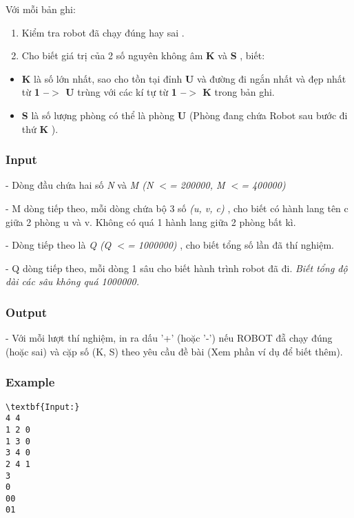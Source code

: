 Với mỗi bản ghi:
\begin{enumerate}
	\item Kiểm tra robot đã chạy đúng hay sai .
	\item Cho biết giá trị của 2 số nguyên không âm \textbf{ K } và \textbf{ S } , biết:
\end{enumerate}
\begin{enumerate}
\end{enumerate}
\begin{itemize}
	\item \textbf{K } là số lớn nhất, sao cho tồn tại đỉnh \textbf{ U } và đường đi ngắn nhất và đẹp nhất từ \textbf{ 1 --$>$ U } trùng với các kí tự từ \textbf{ 1 --$>$ K } trong bản ghi.
	\item \textbf{S } là số lượng phòng có thể là phòng \textbf{ U } (Phòng đang chứa Robot sau bước đi thứ \textbf{ K } ).
\end{itemize}

\subsubsection{Input}

- Dòng đầu chứa hai số \emph{ N } và \emph{ M (N $<$= 200000, M $<$= 400000) }

- M dòng tiếp theo, mỗi dòng chứa bộ 3 số \emph{ (u, v, c) } , cho biết có hành lang tên c giữa 2 phòng u và v. Không có quá 1 hành lang giữa 2 phòng bất kì.

- Dòng tiếp theo là \emph{ Q (Q $<$= 1000000) } , cho biết tổng số lần đã thí nghiệm.

- Q dòng tiếp theo, mỗi dòng 1 sâu cho biết hành trình robot đã đi. \emph{ Biết tổng độ dài các sâu không quá 1000000. }

\subsubsection{Output}

- Với mỗi lượt thí nghiệm, in ra dấu '+' (hoặc '-') nếu ROBOT đẵ chạy đúng (hoặc sai) và cặp số (K, S) theo yêu cầu đề bài (Xem phần ví dụ để biết thêm).

\subsubsection{Example}
\begin{verbatim}
\textbf{Input:}
4 4
1 2 0
1 3 0
3 4 0
2 4 1
3
0
00
01\end{verbatim}

